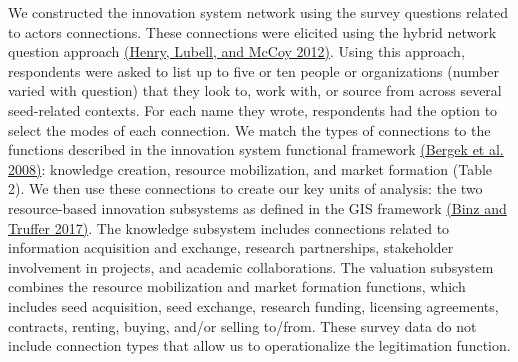 \documentclass[twoside,12pt,final]{ucthesis-CA2012}
\begin{document}
\begin{ucmainmatter}
We constructed the innovation system network using the survey questions
related to actors\textquotesingle{} connections. These connections were elicited using
the \textquotesingle hybrid\textquotesingle{} network question approach \href{https://www.zotero.org/google-docs/?zdREFy}{(Henry, Lubell, and McCoy
2012)}. Using this approach,
respondents were asked to list up to five or ten people or organizations
(number varied with question) that they look to, work with, or source
from across several seed-related contexts. For each name they wrote,
respondents had the option to select the modes of each connection. We
match the types of connections to the functions described in the
innovation system functional framework \href{https://www.zotero.org/google-docs/?HTjSPs}{(Bergek et al.
2008)}: knowledge creation,
resource mobilization, and market formation (Table 2). We then use these
connections to create our key units of analysis: the two resource-based
innovation subsystems as defined in the GIS framework \href{https://www.zotero.org/google-docs/?oVUw7o}{(Binz and Truffer
2017)}. The knowledge
subsystem includes connections related to information acquisition and
exchange, research partnerships, stakeholder involvement in projects,
and academic collaborations. The valuation subsystem combines the
resource mobilization and market formation functions, which includes
seed acquisition, seed exchange, research funding, licensing agreements,
contracts, renting, buying, and/or selling to/from. These survey data do
not include connection types that allow us to operationalize the
legitimation function.
\begin{table}


\end{table}
\end{ucmainmatter}
\end{document}
